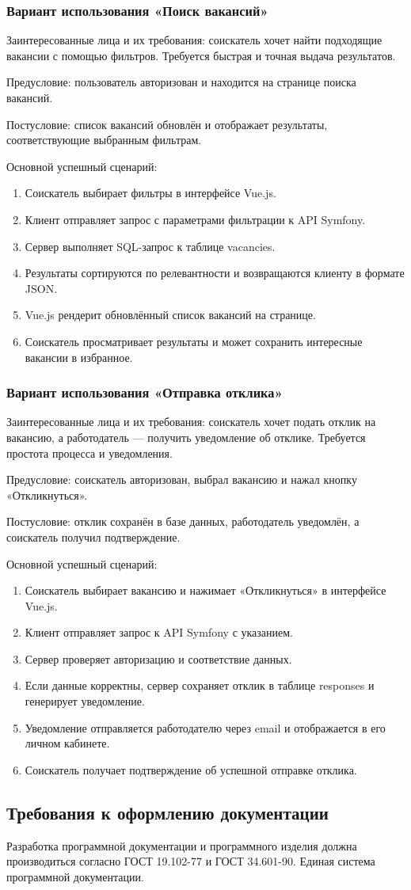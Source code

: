 \subsubsection{Вариант использования «Поиск вакансий»}
Заинтересованные лица и их требования: соискатель хочет найти подходящие вакансии с помощью фильтров. Требуется быстрая и точная выдача результатов.

Предусловие: пользователь авторизован и находится на странице поиска вакансий.

Постусловие: список вакансий обновлён и отображает результаты, соответствующие выбранным фильтрам.

Основной успешный сценарий:

\begin{enumerate}
	\item Соискатель выбирает фильтры в интерфейсе Vue.js.
	\item Клиент отправляет запрос с параметрами фильтрации к API Symfony.
	\item Сервер выполняет SQL-запрос к таблице vacancies.
	\item Результаты сортируются по релевантности и возвращаются клиенту в формате JSON.
	\item Vue.js рендерит обновлённый список вакансий на странице.
	\item Соискатель просматривает результаты и может сохранить интересные вакансии в избранное.
\end{enumerate}

\subsubsection{Вариант использования «Отправка отклика»}
Заинтересованные лица и их требования: соискатель хочет подать отклик на вакансию, а работодатель — получить уведомление об отклике. Требуется простота процесса и уведомления.

Предусловие: соискатель авторизован, выбрал вакансию и нажал кнопку «Откликнуться».

Постусловие: отклик сохранён в базе данных, работодатель уведомлён, а соискатель получил подтверждение.

Основной успешный сценарий:

\begin{enumerate}
	\item Соискатель выбирает вакансию и нажимает «Откликнуться» в интерфейсе Vue.js.
	\item Клиент отправляет запрос к API Symfony с указанием.
	\item Сервер проверяет авторизацию и соответствие данных.
	\item Если данные корректны, сервер сохраняет отклик в таблице responses и генерирует уведомление.
	\item Уведомление отправляется работодателю через email и отображается в его личном кабинете.
	\item Соискатель получает подтверждение об успешной отправке отклика.
\end{enumerate}

\subsection{Требования к оформлению документации}

Разработка программной документации и программного изделия должна производиться согласно ГОСТ 19.102-77 и ГОСТ 34.601-90. Единая система программной документации.
